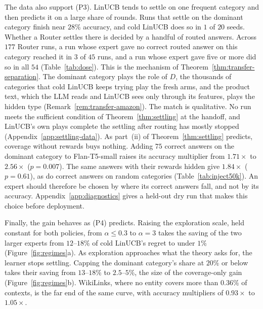 \documentclass[anon]{alt2027} %
\newif\ifrevmarks\revmarkstrue
\newenvironment{revised}{\ifrevmarks\color{revcolor}\fi}{}
\begin{document}
\begin{revised}
The data also support (P3). LinUCB tends to settle on one frequent category
and then predicts it on a large share of rounds. Runs that settle on the
dominant category finish near $28\%$ accuracy, and cold LinUCB does so in
$1$ of $20$ seeds. Whether a Router settles there is decided by a handful of
routed answers. Across $177$ Router runs, a run whose expert gave no correct
routed answer on this category reached it in $3$ of $45$ runs, and a run
whose expert gave five or more did so in all $54$ (Table~\ref{tab:dose}).
This is the mechanism of Theorem~\ref{thm:transfer-separation}. The dominant
category plays the role of $D$, the thousands of categories that cold
LinUCB keeps trying play the fresh arms, and the product text, which the LLM
reads and LinUCB sees only through its features, plays the hidden type
(Remark~\ref{rem:transfer-amazon}). The match is qualitative. No run meets
the sufficient condition of Theorem~\ref{thm:settling} at the handoff, and
LinUCB's own plays complete the settling after routing has mostly stopped
(Appendix~\ref{app:settling-data}). As part~(ii) of
Theorem~\ref{thm:settling} predicts, coverage without rewards buys nothing.
Adding $75$ correct answers on the dominant category to Flan-T5-small raises
its accuracy multiplier from $1.71\times$ to $2.56\times$ ($p=0.007$). The
same answers with their rewards hidden give $1.84\times$ ($p=0.61$), as do
correct answers on random categories (Table~\ref{tab:inject50k}). An expert
should therefore be chosen by where its correct answers fall, and not by its
accuracy. Appendix~\ref{app:diagnostics} gives a held-out dry run that makes
this choice before deployment.
\end{revised}

\begin{revised}
Finally, the gain behaves as (P4) predicts. Raising the exploration scale,
held constant for both policies, from $\alpha\le0.3$ to $\alpha=3$ takes
the saving of the two larger experts from $12$--$18\%$ of cold LinUCB's
regret to under $1\%$ (Figure~\ref{fig:regimes}a). As exploration approaches
what the theory asks for, the learner stops settling. Capping the dominant
category's share at $20\%$ or below takes their saving from $13$--$18\%$ to
$2.5$--$5\%$, the size of the coverage-only gain
(Figure~\ref{fig:regimes}b). WikiLinks, where no entity covers more than
$0.36\%$ of contexts, is the far end of the same curve, with accuracy
multipliers of $0.93\times$ to $1.05\times$.
\end{revised}
\end{document}
